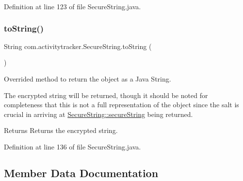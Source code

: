 Definition at line 123 of file Secure\+String.\+java.


\begin{DoxyCode}{0}

\end{DoxyCode}
\mbox{\label{classcom_1_1activitytracker_1_1_secure_string_aef531e12618c5c147adc52fda0d4add8}} 
\subsubsection{\texorpdfstring{toString()}{toString()}}
{\footnotesize\ttfamily String com.\+activitytracker.\+Secure\+String.\+to\+String (\begin{DoxyParamCaption}{ }\end{DoxyParamCaption})}

Overrided method to return the object as a Java String.

The encrypted string will be returned, though it should be noted for completeness that this is not a full representation of the object since the salt is crucial in arriving at \mbox{\hyperlink{classcom_1_1activitytracker_1_1_secure_string_a1448f7b8865c6c57cc7218662ee7f1ee}{Secure\+String\+::secure\+String}} being returned.

\begin{DoxyReturn}{Returns}
Returns the encrypted string. 
\end{DoxyReturn}


Definition at line 136 of file Secure\+String.\+java.


\begin{DoxyCode}{0}

\end{DoxyCode}


\subsection{Member Data Documentation}
\mbox{\label{classcom_1_1activitytracker_1_1_secure_string_a8549ead1f186ff0c2520818b03d1cc21}} 
